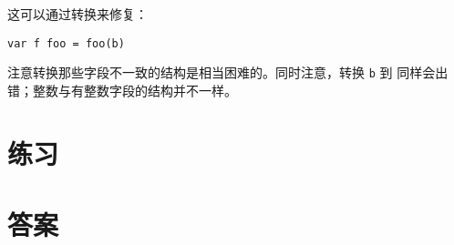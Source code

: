 \noindent{}

\noindent{}这可以通过转换来修复：
\begin{lstlisting}
var f foo = foo(b)
\end{lstlisting}
注意转换那些字段不一致的结构是相当困难的。同时注意，转换
\lstinline{b} 到  同样会出错；整数与有整数字段的结构并不一样。

\section{练习}












\cleardoublepage
\section{答案}
\shipoutAnswer
